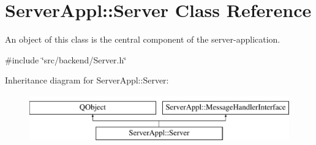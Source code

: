 \hypertarget{class_server_appl_1_1_server}{}\section{Server\+Appl\+:\+:Server Class Reference}
\label{class_server_appl_1_1_server}


An object of this class is the central component of the server-\/application.  




{\ttfamily \#include \char`\"{}src/backend/\+Server.\+h\char`\"{}}

Inheritance diagram for Server\+Appl\+:\+:Server\+:\begin{figure}[H]
\begin{center}
\leavevmode
\includegraphics[height=2.000000cm]{class_server_appl_1_1_server}
\end{center}
\end{figure}
